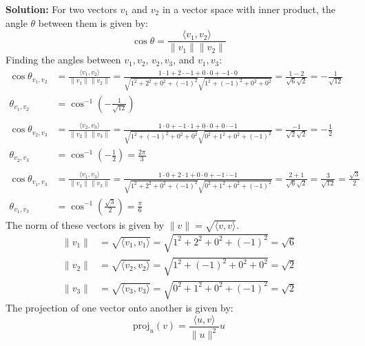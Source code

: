 \documentclass{article}
\begin{document}
\vspace{0.5cm}
\noindent\textbf{Solution:} For two vectors $v_1$ and $v_2$ in a vector space with inner product, the angle $\theta$ between them is given by:
$$ \cos \theta = \frac{\langle v_1, v_2 \rangle}{\|v_1\| \|v_2\|} $$
Finding the angles between $v_1, v_2$, $v_2, v_3$, and $v_1, v_3$:
\begin{align*}
    \cos \theta_{v_1, v_2} &= \frac{\langle v_1, v_2 \rangle}{\|v_1\| \|v_2\|} 
                            = \frac{1 \cdot 1 + 2 \cdot -1 + 0 \cdot 0 + -1 \cdot 0}{\sqrt{1^2 + 2^2 + 0^2 + (-1)^2} \sqrt{1^2 + (-1)^2 + 0^2 + 0^2}}
                            = \frac{1 - 2}{\sqrt{6} \sqrt{2}} = -\frac{1}{\sqrt{12}} \\
    \theta_{v_1, v_2} &= \cos^{-1} \left( -\frac{1}{\sqrt{12}} \right) \\
    \\
    \cos \theta_{v_2, v_3} &= \frac{\langle v_2, v_3 \rangle}{\|v_2\| \|v_3\|}
                            = \frac{1 \cdot 0 + -1 \cdot 1 + 0 \cdot 0 + 0 \cdot -1}{\sqrt{1^2 + (-1)^2 + 0^2 + 0^2} \sqrt{0^2 + 1^2 + 0^2 + (-1)^2}}
                            = \frac{-1}{\sqrt{2} \sqrt{2}} = -\frac{1}{2} \\
    \theta_{v_2, v_3} &= \cos^{-1} \left( -\frac{1}{2} \right) = \frac{2\pi}{3} \\
    \\
    \cos \theta_{v_1, v_3} &= \frac{\langle v_1, v_3 \rangle}{\|v_1\| \|v_3\|}
                            = \frac{1 \cdot 0 + 2 \cdot 1 + 0 \cdot 0 + -1 \cdot -1}{\sqrt{1^2 + 2^2 + 0^2 + (-1)^2} \sqrt{0^2 + 1^2 + 0^2 + (-1)^2}}
                            = \frac{2 + 1}{\sqrt{6} \sqrt{2}} = \frac{3}{\sqrt{12}} = \frac{\sqrt{3}}{2} \\
    \theta_{v_1, v_3} &= \cos^{-1} \left( \frac{\sqrt{3}}{2} \right) = \frac{\pi}{6}
\end{align*}
The norm of these vectors is given by $\|v\| = \sqrt{\langle v, v \rangle}$.
\begin{align*}
    \|v_1\| &= \sqrt{\langle v_1, v_1 \rangle} = \sqrt{1^2 + 2^2 + 0^2 + (-1)^2} = \sqrt{6} \\
    \|v_2\| &= \sqrt{\langle v_2, v_2 \rangle} = \sqrt{1^2 + (-1)^2 + 0^2 + 0^2} = \sqrt{2} \\
    \|v_3\| &= \sqrt{\langle v_3, v_3 \rangle} = \sqrt{0^2 + 1^2 + 0^2 + (-1)^2} = \sqrt{2}
\end{align*}
The projection of one vector onto another is given by:
$$ \text{proj}_u(v) = \frac{\langle u, v \rangle}{\|u\|^2} u $$
\end{document}
